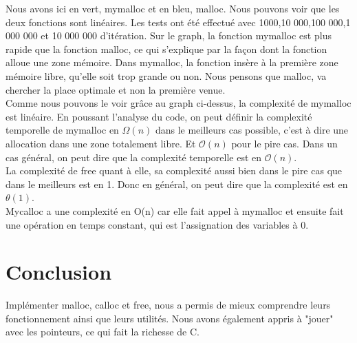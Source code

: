 \documentclass[11pt]{article}
\begin{document}
Nous avons ici en vert, mymalloc et en bleu, malloc. Nous pouvons voir que les deux fonctions sont linéaires. Les tests ont été effectué avec 1000,10 000,100 000,1 000 000 et 10 000 000 d'itération. Sur le graph, la fonction mymalloc est plus rapide que la fonction malloc, ce qui s'explique par la façon dont la fonction alloue une zone mémoire. Dans mymalloc, la fonction insère à la première zone mémoire libre, qu'elle soit trop grande ou non. Nous pensons que malloc, va chercher la place optimale et non la première venue.
\\
Comme nous pouvons le voir grâce au graph ci-dessus, la complexité de mymalloc est linéaire. En poussant l'analyse du code, on peut définir la complexité temporelle de mymalloc en $\mathcal{\Omega}(n)$ dans le meilleurs cas possible, c'est à dire une allocation dans une zone totalement libre. Et $\mathcal{O}(n)$ pour le pire cas. Dans un cas général, on peut dire que la complexité temporelle est en $\mathcal{O}(n)$.
\\
La complexité de free quant à elle, sa complexité aussi bien dans le pire cas que dans le meilleurs est en 1. Donc en général, on peut dire que la complexité est en $\mathcal{\theta}(1)$.
\\
Mycalloc a une complexité en O(n) car elle fait appel à mymalloc et ensuite fait une opération en temps constant, qui est l'assignation des variables à 0.

\section{Conclusion}
Implémenter malloc, calloc et free, nous a permis de mieux comprendre leurs fonctionnement ainsi que leurs utilités. Nous avons également appris à "jouer" avec les pointeurs, ce qui fait la richesse de C.
\end{document}
